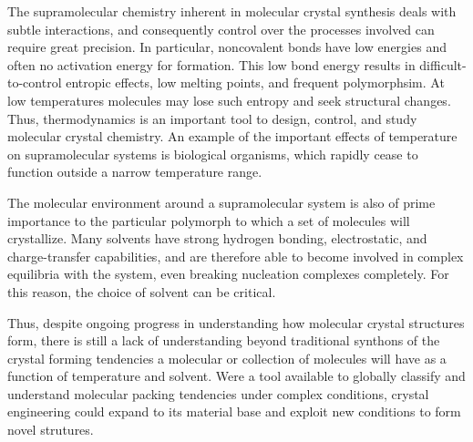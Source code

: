 \documentclass[preprint]{revtex4}
\begin{document}
The supramolecular chemistry inherent in molecular crystal synthesis deals with subtle interactions, and consequently control over the processes involved can require great precision. In particular, noncovalent bonds have low energies and often no activation energy for formation. This low bond energy results in difficult-to-control entropic effects, low melting points, and frequent polymorphsim. At low temperatures molecules may lose such entropy and seek structural changes\cite{Neumann03}.  Thus, thermodynamics is an important tool to design, control, and study molecular crystal chemistry. An example of the important effects of temperature on supramolecular systems is biological organisms, which rapidly cease to function outside a narrow temperature range.

The molecular environment around a supramolecular system is also of prime importance to the particular polymorph to which a set of molecules will crystallize. Many solvents have strong hydrogen bonding, electrostatic, and charge-transfer capabilities, and are therefore able to become involved in complex equilibria with the system, even breaking nucleation complexes completely. For this reason, the choice of solvent can be critical.

Thus, despite ongoing progress in understanding how molecular crystal structures form, there is still a lack of understanding beyond traditional synthons of the crystal forming tendencies a molecular or collection of molecules will have as a function of temperature and solvent.  Were a tool available to globally classify and understand molecular packing tendencies under complex conditions, crystal engineering could expand to its material base and exploit new conditions to form novel strutures.

\end{document}
